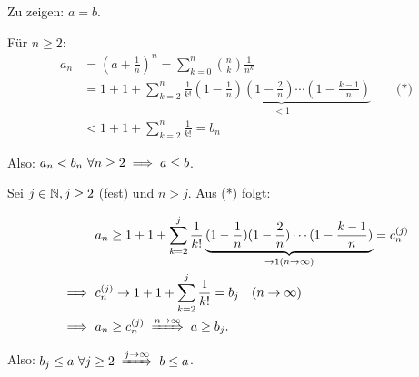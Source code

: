 \documentclass{article}
\begin{document}
Zu zeigen: $a=b$.

Für $n\ge2$:
\begin{align*}
a_n&=(a+\frac{1}{n})^n=\sum_{k=0}^n{\binom{n}{k}\frac{1}{n^k}} \\
&=1+1+\sum_{k=2}^{n}{\frac{1}{k!}\underbrace{(1-\frac{1}{n})(1-\frac{2}{n})\cdots(1-\frac{k-1}{n})}_{<1}}\qquad\text{(*)} \\
&<1+1+\sum_{k=2}^n{\frac{1}{k!}}=b_n
\end{align*}

Also: $a_n<b_n\ \forall n\ge2 \implies a\le b$.

Sei $j\in\mathbb{N}, j\ge 2$ (fest) und $n>j$. Aus (*) folgt:


\begin{align*}
& a_n\ge 1+1+\sum_{k=2}^{j}{\frac{1}{k!}\underbrace{(1-\frac{1}{n})(1-\frac{2}{n})\cdots(1-\frac{k-1}{n})}_{\rightarrow 1(n \rightarrow \infty)}} = c_n^{(j)} \\
\folgt\ & c_n^{(j)} \rightarrow 1+1+\sum_{k=2}^j{\frac{1}{k!}}=b_j\quad(n \rightarrow \infty) \\
\folgt\ & a_n\ge c_n^{(j)} \folgtwegen{n \rightarrow \infty} a\ge b_j\text{.} \\
\end{align*}

Also: $b_j\le a\ \forall j\ge 2 \folgtwegen{j \rightarrow \infty} b\le a$.
\end{document}
